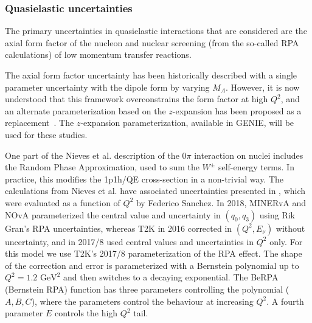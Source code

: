 \subsubsection{Quasielastic uncertainties}
The primary uncertainties in quasielastic interactions that are considered are the axial form factor of the nucleon and nuclear screening (from the so-called RPA calculations) of low momentum transfer reactions.

The axial form factor uncertainty has been historically described with a single parameter uncertainty with the dipole form by varying $M_A$.  However, it is now understood that this framework overconstrains the form factor at high $Q^2$, and an alternate parameterization based on the $z$-expansion has been proposed as a replacement~\cite{Meyer:2016oeg}.  The $z$-expansion parameterization, available in GENIE, will be used for these studies.

One part of the Nieves et al.\cite{nieves1,nieves2} description of the $0\pi$ interaction on nuclei includes the Random Phase Approximation, used to sum the $W^\pm$ self-energy terms. In practice, this modifies the 1p1h/QE cross-section in a non-trivial way. The calculations from Nieves et al. have associated uncertainties presented in \cite{nieves_uncert}, which were evaluated as a function of $Q^2$ by Federico Sanchez. In 2018, MINERvA and NOvA parameterized the central value and uncertainty in $(q_0, q_3)$ using Rik Gran's RPA uncertainties\cite{RikRPA}, whereas T2K in 2016 corrected in $(Q^2, E_\nu)$ without uncertainty, and in 2017/8 used central values and uncertainties in $Q^2$ only.
For this model we use T2K's 2017/8 parameterization of the RPA effect\cite{t2k_2018}. The shape of the correction and error is parameterized with a Bernstein polynomial up to $Q^2=1.2\text{ GeV}^2$ and then switches to a decaying exponential. The BeRPA (Bernstein RPA) function has three parameters controlling the polynomial ($A, B, C$), where the parameters control the behaviour at increasing $Q^2$. A fourth parameter $E$ controls the high $Q^2$ tail. 

